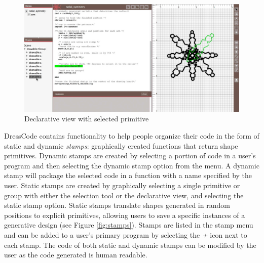 \documentclass{sigchi}
\begin{document}
\begin{center}
\begin{figure}[h!]
\includegraphics[width=\columnwidth]{images/selection_mechanism.jpg}
\caption{Declarative view with selected primitive}
\label{fig:declarative_view}
\end{figure}
\end{center}
\vspace{-20pt}

DressCode contains functionality to help people organize their code in the form of static and dynamic \textit{stamps}: graphically created functions that return shape primitives. Dynamic stamps are created by selecting a portion of code in a user's program and then selecting the dynamic stamp option from the menu. A dynamic stamp will package the selected code in a function with a name specified by the user. Static stamps are created by graphically selecting a single primitive or group with either the selection tool or the declarative view, and selecting the static stamp option. Static stamps translate shapes generated in random positions to explicit primitives, allowing users to save a specific instances of a generative design (see Figure \ref{fig:stamps}).
Stamps are listed in the stamp menu and can be added to a user's primary program by selecting the \textit{+} icon next to each stamp. The code of both static and dynamic stamps can be modified by the user as the code generated is human readable.
\end{document}
